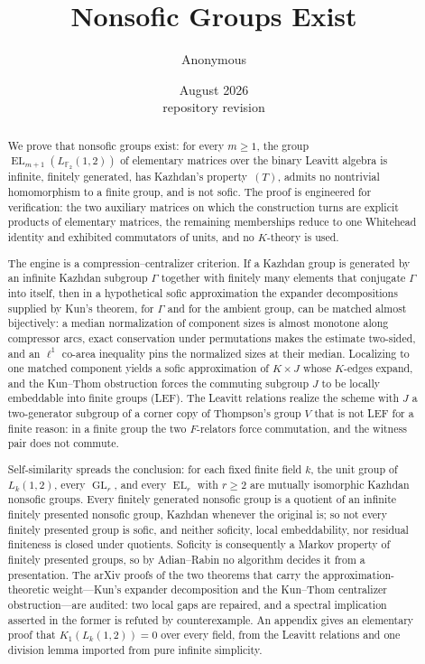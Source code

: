 \documentclass[11pt]{amsart}
\title{Nonsofic Groups Exist}
\author{Anonymous}
\date{August 2026\ifanonymous\else\\[2pt]{\normalsize repository revision \texttt{\leanbreakable{\leancommit}}}\fi}
\theoremstyle{definition}
\theoremstyle{plain}
\newcommand{\F}{\mathbb F}
\newcommand{\GL}{\operatorname{GL}}
\newcommand{\EL}{\operatorname{EL}}
\begin{document}
\begin{abstract}
We prove that nonsofic groups exist: for every \(m\geq1\), the group \(\EL_{m+1}(L_{\F_2}(1,2))\) of elementary matrices over the binary Leavitt algebra is infinite, finitely generated, has Kazhdan's property~\((T)\), admits no nontrivial homomorphism to a finite group, and is not sofic.  The proof is engineered for verification: the two auxiliary matrices on which the construction turns are explicit products of elementary matrices, the remaining memberships reduce to one Whitehead identity and exhibited commutators of units, and no \(K\)-theory is used.

The engine is a compression--centralizer criterion.  If a Kazhdan group is generated by an infinite Kazhdan subgroup \(\Gamma\) together with finitely many elements that conjugate \(\Gamma\) into itself, then in a hypothetical sofic approximation the expander decompositions supplied by Kun's theorem, for \(\Gamma\) and for the ambient group, can be matched almost bijectively: a median normalization of component sizes is almost monotone along compressor arcs, exact conservation under permutations makes the estimate two-sided, and an \(\ell^1\) co-area inequality pins the normalized sizes at their median.  Localizing to one matched component yields a sofic approximation of \(K\times J\) whose \(K\)-edges expand, and the Kun--Thom obstruction forces the commuting subgroup \(J\) to be locally embeddable into finite groups (LEF).  The Leavitt relations realize the scheme with \(J\) a two-generator subgroup of a corner copy of Thompson's group \(V\) that is not LEF for a finite reason: in a finite group the two \(F\)-relators force commutation, and the witness pair does not commute.

Self-similarity spreads the conclusion: for each fixed finite field \(k\), the unit group of \(L_k(1,2)\), every \(\GL_r\), and every \(\EL_r\) with \(r\geq2\) are mutually isomorphic Kazhdan nonsofic groups.  Every finitely generated nonsofic group is a quotient of an infinite finitely presented nonsofic group, Kazhdan whenever the original is; so not every finitely presented group is sofic, and neither soficity, local embeddability, nor residual finiteness is closed under quotients.  Soficity is consequently a Markov property of finitely presented groups, so by Adian--Rabin no algorithm decides it from a presentation.  The arXiv proofs of the two theorems that carry the approximation-theoretic weight---Kun's expander decomposition and the Kun--Thom centralizer obstruction---are audited: two local gaps are repaired, and a spectral implication asserted in the former is refuted by counterexample.  An appendix gives an elementary proof that \(K_1(L_k(1,2))=0\) over every field, from the Leavitt relations and one division lemma imported from pure infinite simplicity.
\end{abstract}
\end{document}
